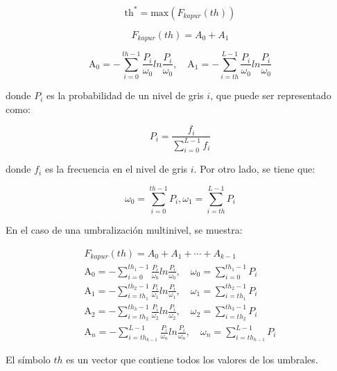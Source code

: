 \documentclass[conference]{IEEEtran}
\begin{document}
\begin{equation}
\text{th}^* = \text{max}(F_{kapur}(th))
\label{eq3}
\end{equation}

\begin{equation}
F_{kapur}(th) = A_0 + A_1
\label{eq4}
\end{equation}

\begin{equation}
\text{A}_0 = - \sum_{i=0}^{th-1} \frac{P_i}{\omega_0} ln\frac{P_i}{\omega_0}, \quad \text{A}_1 = - \sum_{i=th}^{L-1} \frac{P_i}{\omega_0} ln\frac{P_i}{\omega_0}
\label{eq5}
\end{equation}

\noindent donde $P_i$ es la probabilidad de un nivel de gris $i$, que puede ser representado como:

\begin{equation}
P_i =\frac{f_i}{\sum_{i=0}^{L-1} f_i}   
\label{eq6}
\end{equation}

\noindent donde $f_i$ es la frecuencia en el nivel de gris $i$. Por otro lado, se tiene que:

\begin{equation}
\omega_0 = \sum_{i=0}^{th-1} P_i ,   \omega_1 = \sum_{i=th}^{L-1} P_i
\label{eq7}
\end{equation}

\noindent En el caso de una umbralización multinivel, se muestra:

\begin{equation}
\begin{gathered}
F_{kapur}(th) = A_0 + A_1 + \cdots + A_{k-1} \\
\text{A}_0 = - \sum_{i=0}^{th_1-1} \frac{P_i}{\omega_0} ln\frac{P_i}{\omega_0}, \quad \omega_0 = \sum_{i=0}^{th_1-1} P_i  \\
\text{A}_1 = - \sum_{i=th_1}^{th_{2}-1} \frac{P_i}{\omega_1} ln\frac{P_i}{\omega_1}, \quad \omega_1 = \sum_{i=th_1}^{th_{2}-1} P_i \\
\text{A}_2 = - \sum_{i=th_2}^{th_{3}-1} \frac{P_i}{\omega_2} ln\frac{P_i}{\omega_2}, \quad \omega_2 = \sum_{i=th_2}^{th_{3}-1} P_i \\
\text{A}_n = - \sum_{i=th_{k-1}}^{L-1} \frac{P_i}{\omega_n} ln\frac{P_i}{\omega_n}, \quad \omega_n = \sum_{i=th_{k-1}}^{L-1} P_i 
\end{gathered}
\label{eq8}
\end{equation}

\noindent El símbolo $th$ es un vector que contiene todos los valores de los umbrales.
\end{document}
